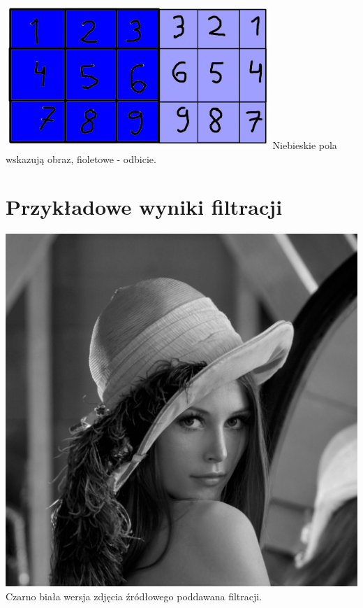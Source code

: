 \documentclass[a4paper,12pt,openany]{report}
\begin{document}
\begin{center}
\includegraphics[width=10cm]{resources/reflect.png}
\linebreak
\tiny{Niebieskie pola wskazują obraz, fioletowe - odbicie.}
\end{center}

\chapter{Przykładowe wyniki filtracji}

\begin{center}
\includegraphics[width=15cm]{resources/modified/lena_gray.jpg}
\linebreak
\tiny{Czarno biała wersja zdjęcia źródłowego poddawana filtracji.}
\end{center}
\end{document}
